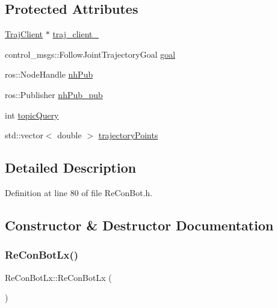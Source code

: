 \subsection*{Protected Attributes}
\begin{DoxyCompactItemize}
\item 
\hyperlink{basic__arm_8cpp_a6fb8875093261cdc69e54d3ac7d5c301}{Traj\+Client} $\ast$ \hyperlink{class_re_con_bot_a14a35ad6ca284af7db7228d7872720d1}{traj\+\_\+client\+\_\+}
\item 
control\+\_\+msgs\+::\+Follow\+Joint\+Trajectory\+Goal \hyperlink{class_re_con_bot_a9bd1c7ddf2376e2e68ea5d8bd8c3f505}{goal}
\item 
ros\+::\+Node\+Handle \hyperlink{class_re_con_bot_a37edfe9c2dbbf37894c9bf850806fdd3}{nh\+Pub}
\item 
ros\+::\+Publisher \hyperlink{class_re_con_bot_a549b7542d286b690f38b7ece8b83850b}{nh\+Pub\+\_\+pub}
\item 
int \hyperlink{class_re_con_bot_aba20d307ac1b2e6b22f96da83a0d937d}{topic\+Query}
\item 
std\+::vector$<$ double $>$ \hyperlink{class_re_con_bot_a7c59e136741800bf0734f659119aa5ee}{trajectory\+Points}
\end{DoxyCompactItemize}


\subsection{Detailed Description}


Definition at line 80 of file Re\+Con\+Bot.\+h.



\subsection{Constructor \& Destructor Documentation}
\mbox{\label{class_re_con_bot_lx_aa4c8b9071629aceec362d46287da4984}} 
\subsubsection{\texorpdfstring{Re\+Con\+Bot\+Lx()}{ReConBotLx()}}
{\footnotesize\ttfamily Re\+Con\+Bot\+Lx\+::\+Re\+Con\+Bot\+Lx (\begin{DoxyParamCaption}{ }\end{DoxyParamCaption})\hspace{0.3cm}{\ttfamily [inline]}}



